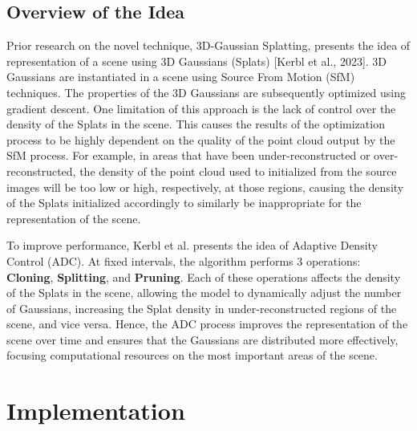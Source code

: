 \documentclass[11pt]{report}
\begin{document}
\section{Overview of the Idea}
Prior research on the novel technique, 3D-Gaussian Splatting, presents the idea of representation of a scene using 3D Gaussians (Splats) [Kerbl et al., 2023]. 3D Gaussians are instantiated in a scene using Source From Motion (SfM) techniques. The properties of the 3D Gaussians are subsequently optimized using gradient descent. One limitation of this approach is the lack of control over the density of the Splats in the scene. This causes the results of the optimization process to be highly dependent on the quality of the point cloud output by the SfM process. For example, in areas that have been under-reconstructed or over-reconstructed, the density of the point cloud used to initialized from the source images will be too low or high, respectively, at those regions, causing the density of the Splats initialized accordingly to similarly be inappropriate for the representation of the scene.

To improve performance, Kerbl et al. presents the idea of Adaptive Density Control (ADC). At fixed intervals, the algorithm performs 3 operations: \textbf{Cloning}, \textbf{Splitting}, and \textbf{Pruning}. Each of these operations affects the density of the Splats in the scene, allowing the model to dynamically adjust the number of Gaussians, increasing the Splat density in under-reconstructed regions of the scene, and vice versa. Hence, the ADC process improves the representation of the scene over time and ensures that the Gaussians are distributed more effectively, focusing computational resources on the most important areas of the scene.



\chapter{Implementation}
\end{document}
